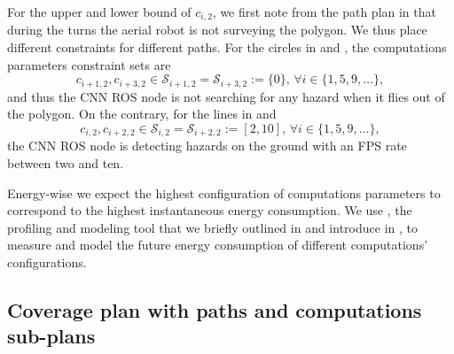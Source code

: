 For the upper and lower bound of $c_{i,2}$, we first note from the path plan in  that during the turns the aerial robot is not surveying the polygon. We thus place different constraints for different paths. For the circles in  and , the computations parameters constraint sets are 
\begin{equation}
  c_{i+1,2},c_{i+3,2}\in\mathcal{S}_{i+1,2}=\mathcal{S}_{i+3,2}:=\{0\},\,\forall i\in\{1,5,9,\dots\},
\end{equation}
and thus the CNN ROS node is not searching for any hazard when it flies out of the polygon. On the contrary, for the lines in  and  
\begin{equation}\label{eq:cnn-comp-const}
c_{i,2},c_{i+2,2}\in\mathcal{S}_{i,2}=\mathcal{S}_{i+2,2}:=[2,10],\,\forall i\in\{1,5,9,\dots\},
\end{equation} 
the CNN ROS node is detecting hazards on the ground with an FPS rate between two and ten.

Energy-wise we expect the highest configuration of computations parameters to correspond to the highest instantaneous energy consumption. We use \powprof{}, the profiling and modeling tool that we briefly outlined in  and introduce in , to measure and model the future energy consumption of different computations' configurations.

\subsection{Coverage plan with paths and computations sub-plans}

